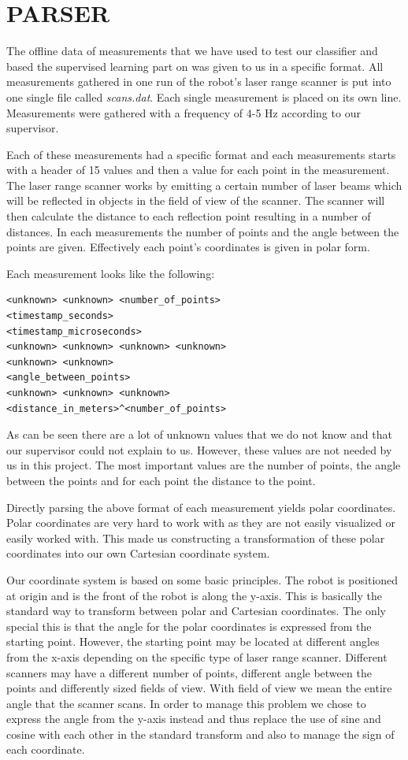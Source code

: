 \documentclass[a4paper, 10pt, conference]{ieeeconf}      %
\begin{document}
\section{PARSER}
The offline data of measurements that we have used to test our classifier and based the supervised learning part on was given to us in a specific format. All measurements gathered in one run of the robot's laser range scanner is put into one single file called \emph{scans.dat}. Each single measurement is placed on its own line. Measurements were gathered with a frequency of 4-5 Hz according to our supervisor.

Each of these measurements had a specific format and each measurements starts with a header of 15 values and then a value for each point in the measurement. The laser range scanner works by emitting a certain number of laser beams which will be reflected in objects in the field of view of the scanner. The scanner will then calculate the distance to each reflection point resulting in a number of distances. In each measurements the number of points and the angle between the points are given. Effectively each point's coordinates is given in polar form.

Each measurement looks like the following:

\begin{verbatim}
<unknown> <unknown> <number_of_points>
<timestamp_seconds> 
<timestamp_microseconds>
<unknown> <unknown> <unknown> <unknown>
<unknown> <unknown> 
<angle_between_points>
<unknown> <unknown> <unknown>
<distance_in_meters>^<number_of_points>
\end{verbatim}

As can be seen there are a lot of unknown values that we do not know and that our supervisor could not explain to us. However, these values are not needed by us in this project. The most important values are the number of points, the angle between the points and for each point the distance to the point.

Directly parsing the above format of each measurement yields polar coordinates. Polar coordinates are very hard to work with as they are not easily visualized or easily worked with. This made us constructing a transformation of these polar coordinates into our own Cartesian coordinate system.

Our coordinate system is based on some basic principles. The robot is positioned at origin and is the front of the robot is along the y-axis. This is basically the standard way to transform between polar and Cartesian coordinates. The only special this is that the angle for the polar coordinates is expressed from the starting point. However, the starting point may be located at different angles from the x-axis depending on the specific type of laser range scanner. Different scanners may have a different number of points, different angle between the points and differently sized fields of view. With field of view we mean the entire angle that the scanner scans. In order to manage this problem we chose to express the angle from the y-axis instead and thus replace the use of sine and cosine with each other in the standard transform and also to manage the sign of each coordinate.
\end{document}

